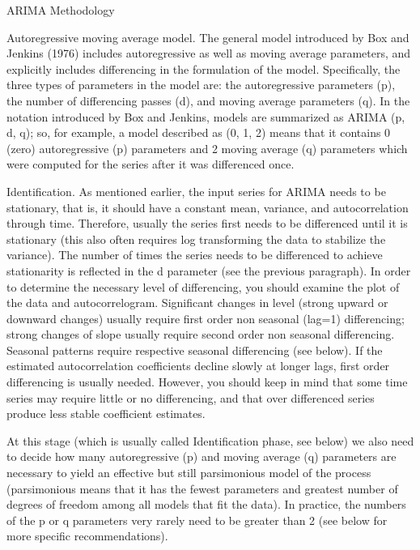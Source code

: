 ARIMA Methodology

Autoregressive moving average model. The general model introduced by Box and Jenkins (1976) includes autoregressive as well as moving average parameters, and explicitly includes differencing in the formulation of the model. Specifically, the three types of parameters in the model are: the autoregressive parameters (p), the number of differencing passes (d), and moving average parameters (q). In the notation introduced by Box and Jenkins, models are summarized as ARIMA (p, d, q); so, for example, a model described as (0, 1, 2) means that it contains 0 (zero) autoregressive (p) parameters and 2 moving average (q) parameters which were computed for the series after it was differenced once.

Identification. As mentioned earlier, the input series for ARIMA needs to be stationary, that is, it should have a constant mean, variance, and autocorrelation through time. Therefore, usually the series first needs to be differenced until it is stationary (this also often requires log transforming the data to stabilize the variance). The number of times the series needs to be differenced to achieve stationarity is reflected in the d parameter (see the previous paragraph). In order to determine the necessary level of differencing, you should examine the plot of the data and autocorrelogram. Significant changes in level (strong upward or downward changes) usually require first order non seasonal (lag=1) differencing; strong changes of slope usually require second order non seasonal differencing. Seasonal patterns require respective seasonal differencing (see below). If the estimated autocorrelation coefficients decline slowly at longer lags, first order differencing is usually needed. However, you should keep in mind that some time series may require little or no differencing, and that over differenced series produce less stable coefficient estimates.

At this stage (which is usually called Identification phase, see below) we also need to decide how many autoregressive (p) and moving average (q) parameters are necessary to yield an effective but still parsimonious model of the process (parsimonious means that it has the fewest parameters and greatest number of degrees of freedom among all models that fit the data). In practice, the numbers of the p or q parameters very rarely need to be greater than 2 (see below for more specific recommendations).

